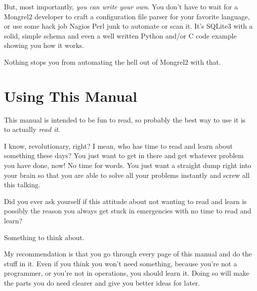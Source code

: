 But, most importantly, \emph{you can write your own}.  You don't have to wait
for a Mongrel2 developer to craft a configuration file parser for your favorite
language, or use some hack job Nagios Perl junk to automate or scan it.  It's
SQLite3 with a solid, simple schema and even a well written Python and/or C
code example showing you how it works.

Nothing stops you from automating the hell out of Mongrel2 with that.


\section{Using This Manual}

This manual is intended to be fun to read, so probably the best way to use it
is to actually \emph{read it}.

I know, revolutionary, right?  I mean, who has time to read and learn about something
these days?  You just want to get in there and get whatever problem you have done,
now! No time for words.  You just want a straight dump right into your brain so
that you are able to solve all your problems instantly and screw all this talking.

Did you ever ask yourself if this attitude about not wanting to read and learn is
possibly the reason you always get stuck in emergencies with no time to read
and learn?

Something to think about.

My recommendation is that you go through every page of this manual and do the
stuff in it.  Even if you think you won't need something, because you're not
a programmer, or you're not in operations, you should learn it.  Doing so will
make the parts you do need clearer and give you better ideas for later.



